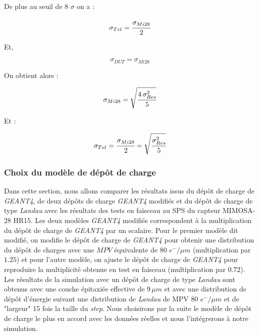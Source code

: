    De plus au seuil de 8 $\sigma$ on a :
   
   \begin{equation}
    \sigma_{Tel} = \cfrac{\sigma_{Mi28}}{2}
   \end{equation}
   
   Et,
   
   \begin{equation}
    \sigma_{DUT} = \sigma_{Mi28}
   \end{equation}

   On obtient alors :
   
   \begin{equation}
    \sigma_{Mi28} = \sqrt{ \cfrac{4 \, \sigma_{Res}^2}{5} } 
   \end{equation}

   Et :
   
   \begin{equation}
    \sigma_{Tel} = \cfrac{\sigma_{Mi28}}{2} = \sqrt{ \cfrac{\sigma_{Res}^2}{5} }
    \label{eq:reso_tel_models}
   \end{equation}
   
   \subsubsection{Choix du mod\`ele de d\'ep\^ot de charge}

   Dans cette section, nous allons comparer les r\'esultats issus du d\'epôt de charge de \textit{GEANT4}, de deux d\'epôts de charge \textit{GEANT4} modifi\'es et du d\'epôt de charge de type \textit{Landau} avec les r\'esultats des tests en faisceau au SPS du capteur MIMOSA-28 HR15. Les deux mod\`eles \textit{GEANT4} modifi\'es correspondent \`a la multiplication du dépôt de charge de \textit{GEANT4} par un scalaire. Pour le premier mod\`ele dit modifi\'e, on modifie le d\'epôt de charge de \textit{GEANT4} pour obtenir une distribution du d\'epôt de charges avec une $MPV$ \'equivalente de 80 $e^-/\mu m$ (multiplication par $1.25$) et pour l'autre mod\`ele, on ajuste le d\'epôt de charge de \textit{GEANT4} pour reproduire la multiplicit\'e obtenue en test en faisceau (multiplication par $0.72$). Les r\'esultats de la simulation avec un d\'ep\^ot de charge de type \textit{Landau} sont obtenus avec une couche épitaxiée effective de $9 \, \mu m$ et avec une distribution de d\'ep\^ot d'\'energie suivant une distribution de \textit{Landau} de MPV 80 $e^-/\mu m$ et de "largeur" 15 fois la taille du \textit{step}. Nous choisirons par la suite le mod\`ele de d\'epôt de charge le plus en accord avec les donn\'ees r\'eelles et nous l'int\'egrerons \`a  notre simulation.
      
